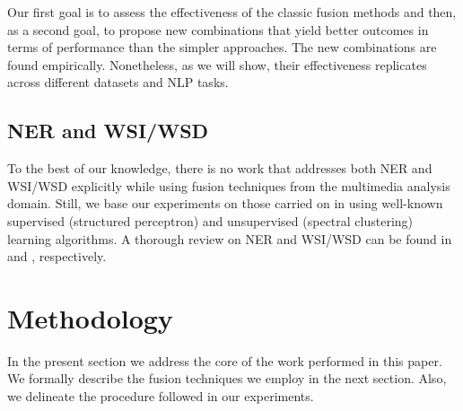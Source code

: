\documentclass{llncs}
\begin{document}
Our first goal is to assess the effectiveness of the classic fusion methods and then, as a second goal, to propose new combinations that yield better outcomes in terms of performance than the simpler approaches. The new combinations are found empirically. Nonetheless, as we will show, their effectiveness replicates across different datasets and NLP tasks. 
%
%


\subsection{NER and WSI/WSD}
To the best of our knowledge, there is no work that addresses both NER and WSI/WSD explicitly while using fusion techniques from the multimedia analysis domain. Still, we base our experiments on those carried on in \cite{Collins2002,Daume2006,GoyalH14} using well-known supervised (structured perceptron) and unsupervised (spectral clustering) learning algorithms. A thorough review on NER and WSI/WSD can be found in \cite{nadeau2007survey} and \cite{navigli2009word}, respectively.

\section{Methodology}
In the present section we address the core of the work performed in this paper.
We formally describe the fusion techniques we employ in the next section. Also, we  delineate the procedure followed in our experiments. 


\end{document}
